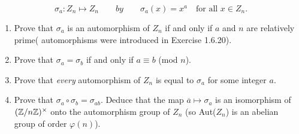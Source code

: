 \begin{enumerate}
                  $$\sigma_a : Z_n \mapsto Z_n \qquad by \qquad \sigma_a(x) =
                  x^a \quad \text{for all } x \in Z_n.$$
                  \begin{enumerate}
                     \item Prove that $\sigma_a$ is an automorphism of $Z_n$ if
                           and only if $a$ and $n$ are relatively prime(
                           automorphisms were introduced in Exercise 1.6.20).
                     \item Prove that $\sigma_a = \sigma_b$ if and only if
                           $a \equiv b$ (mod $n$).
                     \item Prove that \textit{every} automorphism of $Z_n$ is
                           equal to $\sigma_a$ for some integer $a$.
                     \item Prove that $\sigma_a\circ\sigma_b=\sigma_{ab}$.
                           Deduce that the map $\overline{a} \mapsto \sigma_a$
                           is an isomorphism of $(\mathbb{Z}/n\mathbb{Z})^\times$ onto the
                           automorphism group of $Z_n$ (so Aut($Z_n$) is an
                           abelian group of order $\varphi(n)$).
                  \end{enumerate}
\end{enumerate}

































